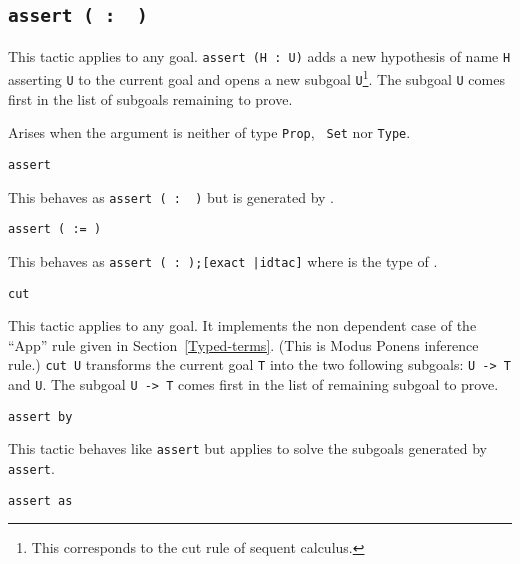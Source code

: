 \begin{coq_example*}
\subsection{\tt assert ( {\ident} :\ {\form} )}

This tactic applies to any goal. {\tt assert (H : U)} adds a new
hypothesis of name \texttt{H} asserting \texttt{U} to the current goal
and opens a new subgoal \texttt{U}\footnote{This corresponds to the
  cut rule of sequent calculus.}. The subgoal {\texttt U} comes first
in the list of subgoals remaining to prove.

\begin{ErrMsgs}
\item {}

  Arises when the argument {\form} is neither of type {\tt Prop}, {\tt
    Set} nor {\tt Type}.

\end{ErrMsgs}

\begin{Variants}

\item{\tt assert {\form}}

  This behaves as {\tt assert ( {\ident} :\ {\form} )} but
  {\ident} is generated by {\Coq}.

\item{\tt assert ( {\ident} := {\term} )}

  This behaves as {\tt assert ({\ident} :\ {\type});[exact
    {\term}|idtac]} where {\type} is the type of {\term}.

\item {\tt cut {\form}}

  This tactic applies to any goal. It implements the non dependent
  case of the ``App'' rule given in
  Section~\ref{Typed-terms}. (This is Modus Ponens inference rule.)
  {\tt cut U} transforms the current goal \texttt{T} into the two
  following subgoals: {\tt U -> T} and \texttt{U}.  The subgoal {\tt U
    -> T} comes first in the list of remaining subgoal to prove.

\item \texttt{assert {\form} by {\tac}}

  This tactic behaves like \texttt{assert} but applies {\tac}
  to solve the subgoals generated by \texttt{assert}.

\item \texttt{assert {\form} as {\intropattern}}


\end{Variants}
\end{coq_example*}
